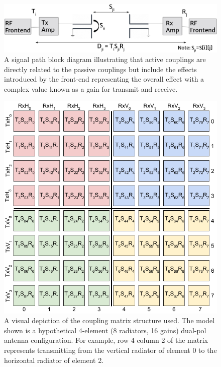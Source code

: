 \documentclass[journal]{IEEEtran}
\begin{document}
\begin{figure}[hptb]
    \centering
    \includegraphics[width=1\linewidth]{ActiveCoupling.png}
    \vspace{-0.2in}
    \caption{A signal path block diagram illustrating that active couplings are directly related to the passive couplings but include the effects introduced by the front-end representing the overall effect with a complex value known as a gain for transmit and receive.}
    \label{fig:ActiveCoupling}
\end{figure}

\begin{figure}[hptb]
    \centering
    \includegraphics[width=1\linewidth]{CouplingMatrix.png}
    \vspace{-0.2in}
    \caption{A visual depiction of the coupling matrix structure used. The model shown is a hypothetical 4-element (8 radiators, 16 gains) dual-pol antenna configuration. For example, row 4 column 2 of the matrix represents transmitting from the vertical radiator of element 0 to the horizontal radiator of element 2.}
    \label{fig:couplingMatrix}
\end{figure}
\end{document}
